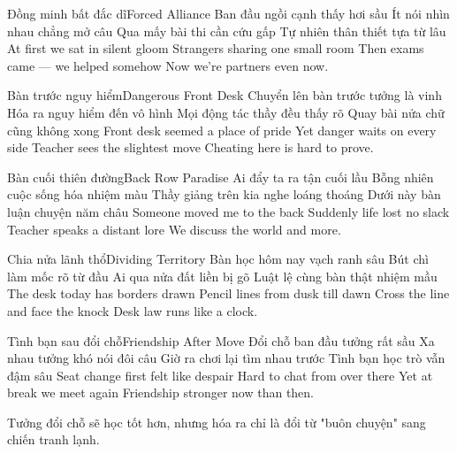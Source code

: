\begin{tutuyetbox}{Đồng minh bất đắc dĩ}{Forced Alliance}
Ban đầu ngồi cạnh thấy hơi sầu
Ít nói nhìn nhau chẳng mở câu
Qua mấy bài thi cần cứu gấp
Tự nhiên thân thiết tựa từ lâu
\tcblower
At first we sat in silent gloom
Strangers sharing one small room
Then exams came — we helped somehow
Now we're partners even now.
\end{tutuyetbox}

\begin{tutuyetbox}{Bàn trước nguy hiểm}{Dangerous Front Desk}
Chuyển lên bàn trước tưởng là vinh
Hóa ra nguy hiểm đến vô hình
Mọi động tác thầy đều thấy rõ
Quay bài nửa chữ cũng không xong
\tcblower
Front desk seemed a place of pride
Yet danger waits on every side
Teacher sees the slightest move
Cheating here is hard to prove.
\end{tutuyetbox}

\begin{tutuyetbox}{Bàn cuối thiên đường}{Back Row Paradise}
Ai đẩy ta ra tận cuối lầu
Bỗng nhiên cuộc sống hóa nhiệm màu
Thầy giảng trên kia nghe loáng thoáng
Dưới này bàn luận chuyện năm châu
\tcblower
Someone moved me to the back
Suddenly life lost no slack
Teacher speaks a distant lore
We discuss the world and more.
\end{tutuyetbox}

\begin{tutuyetbox}{Chia nửa lãnh thổ}{Dividing Territory}
Bàn học hôm nay vạch ranh sâu
Bút chì làm mốc rõ từ đầu
Ai qua nửa đất liền bị gõ
Luật lệ cùng bàn thật nhiệm mầu
\tcblower
The desk today has borders drawn
Pencil lines from dusk till dawn
Cross the line and face the knock
Desk law runs like a clock.
\end{tutuyetbox}

\begin{tutuyetbox}{Tình bạn sau đổi chỗ}{Friendship After Move}
Đổi chỗ ban đầu tưởng rất sầu
Xa nhau tưởng khó nói đôi câu
Giờ ra chơi lại tìm nhau trước
Tình bạn học trò vẫn đậm sâu
\tcblower
Seat change first felt like despair
Hard to chat from over there
Yet at break we meet again
Friendship stronger now than then.
\end{tutuyetbox}



\begin{ghichu}
Tưởng đổi chỗ sẽ học tốt hơn, nhưng hóa ra chỉ là đổi từ "buôn chuyện" sang chiến tranh lạnh.
\end{ghichu}